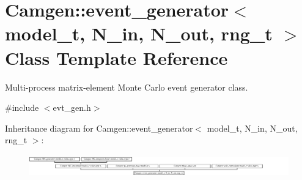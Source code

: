 \hypertarget{a00212}{}\section{Camgen\+:\+:event\+\_\+generator$<$ model\+\_\+t, N\+\_\+in, N\+\_\+out, rng\+\_\+t $>$ Class Template Reference}
\label{a00212}


Multi-\/process matrix-\/element Monte Carlo event generator class.  




{\ttfamily \#include $<$evt\+\_\+gen.\+h$>$}

Inheritance diagram for Camgen\+:\+:event\+\_\+generator$<$ model\+\_\+t, N\+\_\+in, N\+\_\+out, rng\+\_\+t $>$\+:\begin{figure}[H]
\begin{center}
\leavevmode
\includegraphics[height=0.968300cm]{a00212}
\end{center}
\end{figure}
